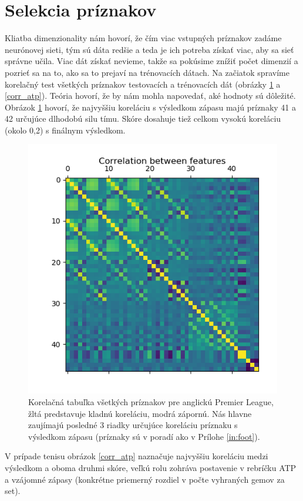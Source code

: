 \section{Selekcia príznakov}
Kliatba dimenzionality nám hovorí, že čím viac vstupných príznakov zadáme neurónovej sieti, tým sú dáta redšie a teda je ich potreba získať viac, aby sa sieť správne učila. Viac dát získať nevieme, takže sa pokúsime znížiť počet dimenzií a pozrieť sa na to, ako sa to prejaví na trénovacích dátach.
Na začiatok spravíme korelačný test všetkých príznakov testovacích a trénovacích dát (obrázky \ref{corr} a \ref{corr_atp}).
Teória hovorí, že by nám mohla napovedať, aké hodnoty sú dôležité.
Obrázok \ref{corr} hovorí, že najvyššiu koreláciu s výsledkom zápasu majú príznaky 41 a 42 určujúce dlhodobú silu tímu. Skóre dosahuje tiež celkom vysokú koreláciu (okolo 0,2) s finálnym výsledkom.
\noindent
\begin{figure} \label{corr}
\includegraphics[scale=0.9]{../img/correng.png}
\caption{Korelačná tabuľka všetkých príznakov pre anglickú Premier League, žltá predstavuje kladnú koreláciu, modrá zápornú. Nás hlavne zaujímajú posledné 3 riadky určujúce koreláciu príznaku s výsledkom zápasu (príznaky sú v poradí ako v Prílohe \ref{in:foot}).}
\end{figure}

V prípade tenisu obrázok \ref{corr_atp} naznačuje najvyššiu koreláciu medzi výsledkom a oboma druhmi skóre, veľkú rolu zohráva postavenie v rebríčku ATP a vzájomné zápasy (konkrétne priemerný rozdiel v počte vyhraných gemov za set).


